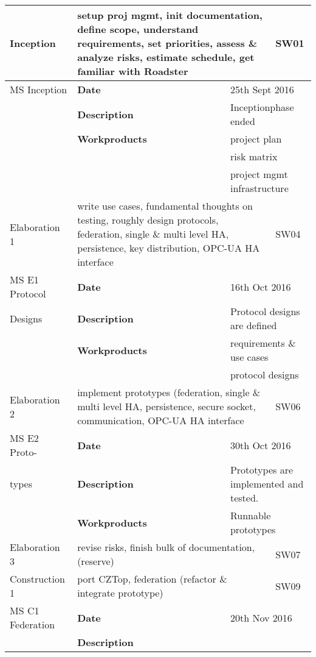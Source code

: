 \begin{center}
\begin{longtable}{|p{25mm}|p{25mm} p{45mm}|p{10mm}|}
    \hline
    \endlastfoot
	Inception
		& \multicolumn{2}{p{70mm}|}{setup proj mgmt, init documentation, define scope, understand requirements,
		set priorities, assess \& analyze risks, estimate schedule, get familiar with Roadster}
		& SW01 \\ \hline
	MS Inception
		& \textbf{Date}
		& \multicolumn{2}{l|}{25th Sept 2016} \\
		& \textbf{Description}
		& \multicolumn{2}{l|}{Inceptionphase ended} \\
		& \textbf{Workproducts}
		& \multicolumn{2}{l|}{project plan} \\
		& & \multicolumn{2}{l|}{risk matrix} \\
		& & \multicolumn{2}{l|}{project mgmt infrastructure} \\ \hline
	Elaboration 1
		& \multicolumn{2}{p{70mm}|}{write use cases, fundamental thoughts on testing, roughly design protocols,
		federation, single \& multi level HA, persistence, key distribution, OPC-UA HA interface}
		& SW04 \\ \hline
	MS E1 Protocol
		& \textbf{Date}
		& \multicolumn{2}{l|}{16th Oct 2016} \\
		Designs & \textbf{Description}
		& \multicolumn{2}{l|}{Protocol designs are defined} \\
		& \textbf{Workproducts}
		& \multicolumn{2}{l|}{requirements \& use cases} \\
		& & \multicolumn{2}{l|}{protocol designs} \\ \hline
	Elaboration 2
		& \multicolumn{2}{p{70mm}|}{implement prototypes (federation, single \& multi level HA, persistence, secure socket,
		communication, OPC-UA HA interface}
		& SW06 \\ \hline
	MS E2 Proto-
		& \textbf{Date}
		& \multicolumn{2}{l|}{30th Oct 2016} \\
	types & \textbf{Description}
		& \multicolumn{2}{l|}{Prototypes are implemented and tested.} \\
		& \textbf{Workproducts}
		& \multicolumn{2}{l|}{Runnable prototypes} \\ \hline
	Elaboration 3
		& \multicolumn{2}{p{70mm}|}{revise risks, finish bulk of documentation, (reserve)}
		& SW07 \\ \hline
	Construction 1
		& \multicolumn{2}{p{70mm}|}{port CZTop, federation (refactor \& integrate prototype)}
		& SW09 \\ \hline
	MS C1 Federation
		& \textbf{Date}
		& \multicolumn{2}{l|}{20th Nov 2016} \\
		& \textbf{Description}

\end{longtable}
\end{center}

